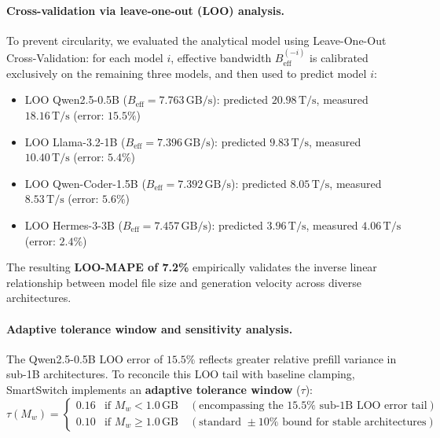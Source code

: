 \documentclass[11pt,a4paper]{article}
\newcommand{\Ts}{\,\mathrm{T/s}}
\newcommand{\GBs}{\,\mathrm{GB/s}}
\newcommand{\GB}{\,\mathrm{GB}}
\begin{document}
\paragraph{Cross-validation via leave-one-out (LOO) analysis.}
To prevent circularity, we evaluated the analytical model using Leave-One-Out Cross-Validation: for each model $i$, effective bandwidth $B_{\mathrm{eff}}^{(-i)}$ is calibrated exclusively on the remaining three models, and then used to predict model $i$:
\begin{itemize}[leftmargin=*]
\item LOO Qwen2.5-0.5B ($B_{\mathrm{eff}} = 7.763\GBs$): predicted $20.98\Ts$, measured $18.16\Ts$ (error: $15.5\%$)
\item LOO Llama-3.2-1B ($B_{\mathrm{eff}} = 7.396\GBs$): predicted $9.83\Ts$, measured $10.40\Ts$ (error: $5.4\%$)
\item LOO Qwen-Coder-1.5B ($B_{\mathrm{eff}} = 7.392\GBs$): predicted $8.05\Ts$, measured $8.53\Ts$ (error: $5.6\%$)
\item LOO Hermes-3-3B ($B_{\mathrm{eff}} = 7.457\GBs$): predicted $3.96\Ts$, measured $4.06\Ts$ (error: $2.4\%$)
\end{itemize}
The resulting \textbf{LOO-MAPE of 7.2\%} empirically validates the inverse linear relationship between model file size and generation velocity across diverse architectures.

\paragraph{Adaptive tolerance window and sensitivity analysis.}
The Qwen2.5-0.5B LOO error of $15.5\%$ reflects greater relative prefill variance in sub-1B architectures. To reconcile this LOO tail with baseline clamping, SmartSwitch implements an \textbf{adaptive tolerance window} ($\tau$):
\begin{equation}\label{eq:adaptive_tol}
\tau(M_w) = \begin{cases} 
0.16 & \text{if } M_w < 1.0\GB \quad (\text{encompassing the } 15.5\% \text{ sub-1B LOO error tail}) \\
0.10 & \text{if } M_w \ge 1.0\GB \quad (\text{standard } \pm10\% \text{ bound for stable architectures})
\end{cases}
\end{equation}
\end{document}
